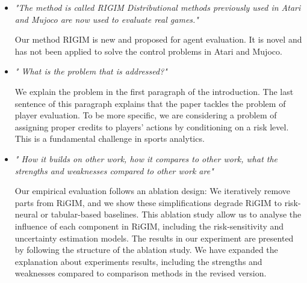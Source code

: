 \documentclass[letterpaper]{article} %
\begin{document}
\begin{itemize}
     Our work involves interdisciplinary study from both sports analytics and Reinforcement Learning (RL). From the perspective of sports analytics, player evaluation is an important topic that has been studied by many previous works(see our related work Section 2). Assigning values to players' actions is a common approach for player evaluation, but none of the previous works has considered risk or uncertainty during evaluation. Our work extends the action-value approach by adding the dimension of risk to evaluation. This extension is {\bf fundamental} since sports games (especially team sports) have {\bf inherent risk and uncertainty}, which should not be ignored during evaluation. When it comes to RL, some recent works (i.e., offline RL) have studied the approach of adjusting action values according to uncertainty estimates, but these works often {\bf do not explicitly model the epistemic and aleatoric uncertainties} (in most cases, the estimation can not be disentangled into epistemic and aleatoric uncertainties, see [Mavrin2019]). Our work proposes a framework that enables this estimation. We have clarified it in the revised version.\medskip

[Mavrin2019] Borislav Mavrin, Hengshuai Yao, Linglong Kong, Kaiwen Wu, and Yaoliang Yu. Distributional reinforcement learning for efficient exploration. In International Conference on Machine Learning (ICML), volume 97, pages 4424–4434, 2019.\medskip

    \item {\it "The method is called RIGIM Distributional methods previously used in Atari and Mujoco are now used to evaluate real games."}

    Our method RIGIM is new and proposed for agent evaluation. It is novel and has not been applied to solve the control problems in Atari and Mujoco.\medskip

    \item {\it " What is the problem that is addressed?"}

    We explain the problem in the first paragraph of the introduction. The last sentence of this paragraph explains that the paper tackles the problem of player evaluation. To be more specific, we are considering a problem of assigning proper credits to players' actions by conditioning on a risk level. This is a fundamental challenge in sports analytics.\medskip

    \item {\it " How it builds on other work, how it compares to other work, what the strengths and weaknesses compared to other work are"}

    Our empirical evaluation follows an ablation design: We iteratively remove parts from RiGIM, and we show these simplifications degrade RiGIM to risk-neural or tabular-based baselines. This ablation study allow us to analyse the influence of each component in RiGIM, including the risk-sensitivity and uncertainty estimation models. The results in our experiment are presented by following the structure of the ablation study. We have expanded the explanation about experiments results, including the strengths and weaknesses compared to comparison methods in the revised version.\medskip
\end{itemize}
\end{document}
